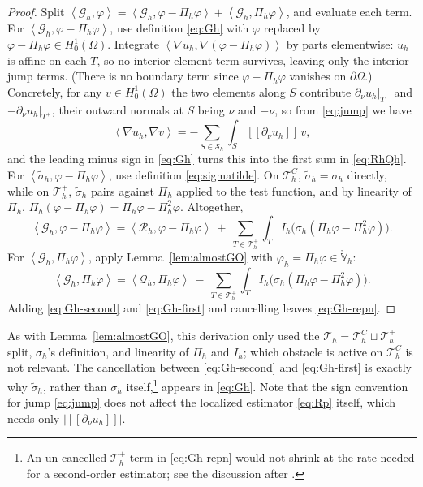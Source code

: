 \documentclass[12pt]{amsart}
\numberwithin{equation}{section}
\theoremstyle{plain}
\theoremstyle{definition}
\theoremstyle{remark}
\newcommand{\Om}{\Omega}
\newcommand{\dOm}{\partial\Omega}
\newcommand{\Th}{\mathcal{T}_h}
\newcommand{\Vhr}{\mathring{\mathbb{V}}_h}
\newcommand{\Sh}{\mathcal{S}_h}
\newcommand{\Ih}{I_h}
\newcommand{\Pih}{\Pi_h}
\newcommand{\Thplus}{\Th^+}
\newcommand{\ThC}{\Th^C}
\newcommand{\Gh}{\mathcal{G}_h}
\newcommand{\Rh}{\mathcal{R}_h}
\newcommand{\Qh}{\mathcal{Q}_h}
\newcommand{\jump}[1]{[\![#1]\!]}
\begin{document}
\begin{proof}
Split $\left<\Gh,\varphi\right> = \left<\Gh,\varphi-\Pih\varphi\right> + \left<\Gh,\Pih\varphi\right>$, and evaluate each term.  For $\left<\Gh,\varphi-\Pih\varphi\right>$, use definition \eqref{eq:Gh} with $\varphi$ replaced by $\varphi - \Pih\varphi \in H_0^1(\Om)$.  Integrate $\left<\nabla u_h,\nabla(\varphi-\Pih\varphi)\right>$ by parts elementwise: $u_h$ is affine on each $T$, so no interior element term survives, leaving only the interior jump terms.  (There is no boundary term since $\varphi-\Pih\varphi$ vanishes on $\dOm$.)  Concretely, for any $v \in H_0^1(\Om)$ the two elements along $S$ contribute $\partial_\nu u_h|_{T^-}$ and $-\partial_\nu u_h|_{T^+}$, their outward normals at $S$ being $\nu$ and $-\nu$, so from \eqref{eq:jump} we have
\begin{equation}
\label{eq:byparts}
  \left<\nabla u_h,\nabla v\right> = -\sum_{S\in\Sh}\int_S \jump{\partial_\nu u_h}\,v,
\end{equation}
and the leading minus sign in \eqref{eq:Gh} turns this into the first sum in \eqref{eq:RhQh}.  For $\left<\tilde\sigma_h,\varphi-\Pih\varphi\right>$, use definition \eqref{eq:sigmatilde}.  On $\ThC$, $\tilde\sigma_h=\sigma_h$ directly, while on $\Thplus$, $\tilde\sigma_h$ pairs against $\Pih$ applied to the test function, and by linearity of $\Pih$, $\Pih(\varphi-\Pih\varphi) = \Pih\varphi - \Pih^2\varphi$.  Altogether,
\begin{equation}
\label{eq:Gh-first}
  \left<\Gh,\varphi-\Pih\varphi\right> = \left<\Rh,\varphi-\Pih\varphi\right> \ +\ \sum_{T\in\Thplus}\int_T \Ih\bigl(\sigma_h(\Pih\varphi-\Pih^2\varphi)\bigr).
\end{equation}
For $\left<\Gh,\Pih\varphi\right>$, apply Lemma~\ref{lem:almostGO} with $\varphi_h=\Pih\varphi\in\Vhr$:
\begin{equation}
\label{eq:Gh-second}
  \left<\Gh,\Pih\varphi\right> = \left<\Qh,\Pih\varphi\right> \ -\ \sum_{T\in\Thplus}\int_T \Ih\bigl(\sigma_h(\Pih\varphi-\Pih^2\varphi)\bigr).
\end{equation}
Adding \eqref{eq:Gh-second} and \eqref{eq:Gh-first} and cancelling leaves \eqref{eq:Gh-repn}.
\end{proof}

As with Lemma~\ref{lem:almostGO}, this derivation only used the $\Th = \ThC \sqcup \Thplus$ split, $\sigma_h$'s definition, and linearity of $\Pih$ and $\Ih$; which obstacle is active on $\ThC$ is not relevant.  The cancellation between \eqref{eq:Gh-second} and \eqref{eq:Gh-first} is exactly why $\tilde\sigma_h$, rather than $\sigma_h$ itself,\footnote{An un-cancelled $\Thplus$ term in \eqref{eq:Gh-repn} would not shrink at the rate needed for a second-order estimator; see the discussion after \cite[formula (3.6)]{NSV03}.} appears in \eqref{eq:Gh}.  Note that the sign convention for jump \eqref{eq:jump} does not affect the localized estimator \eqref{eq:Rp} itself, which needs only $|\jump{\partial_\nu u_h}|$.
\end{document}
